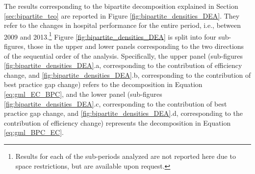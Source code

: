 \documentclass[11pt,a4paper,oneside]{article}
\begin{document}








The results corresponding to the bipartite decomposition explained in Section \ref{sec:bipartite_teo} are reported in Figure \ref{fig:bipartite_densities_DEA}. They refer to the changes in hospital performance for the entire period, i.e., between 2009 and 2013.\footnote{Results for each of the sub-periods analyzed are not reported here due to space restrictions, but are available upon request.} Figure \ref{fig:bipartite_densities_DEA} is split into four sub-figures, those in the upper and lower panels corresponding to the two directions of the sequential order of the analysis. Specifically, the upper panel (sub-figures \ref{fig:bipartite_densities_DEA}.a, corresponding to the contribution of efficiency change, and \ref{fig:bipartite_densities_DEA}.b, corresponding to the contribution of best practice gap change) refers to the decomposition in Equation \eqref{eq:gml_EC_BPC}, and the lower panel (sub-figures \ref{fig:bipartite_densities_DEA}.c, corresponding to the contribution of best practice gap change, and \ref{fig:bipartite_densities_DEA}.d, corresponding to the contribution of efficiency change) represents the decomposition in Equation \eqref{eq:gml_BPC_EC}. 


%
%
%





\end{document}
